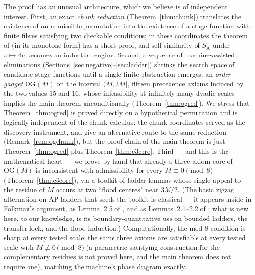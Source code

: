 \documentclass[11pt]{article}
\theoremstyle{definition}
\newcommand{\SA}{S_{\mathrm{A}}}
\newcommand{\OG}{\mathrm{OG}}
\begin{document}
The proof has an unusual architecture, which we believe is of independent
interest. First, an exact \emph{chunk reduction} (Theorem~\ref{thm:chunk})
translates the existence of an admissible permutation into the existence of
a stage function with finite fibres satisfying two checkable conditions; in
these coordinates the theorem of \cite{DEGS77} (in its monotone form) has a
short proof, and self-similarity of $\SA$ under $v \mapsto 4v$ becomes
an induction engine. Second, a sequence of machine-assisted eliminations
(Sections~\ref{sec:negative}--\ref{sec:ladder}) shrinks the search space of
candidate stage functions until a single finite obstruction emerges: an
\emph{order gadget} $\OG(M)$ on the interval $(M, 2M]$, fifteen precedence
axioms induced by the two values $15$ and $16$, whose infeasibility at
infinitely many dyadic scales implies the main theorem unconditionally
(Theorem~\ref{thm:ogred}). We stress that Theorem~\ref{thm:ogred} is
proved directly on a hypothetical permutation and is logically independent
of the chunk calculus: the chunk coordinates served as the discovery
instrument, and give an alternative route to the same reduction
(Remark~\ref{rem:ogchunk}), but the proof chain of the main theorem is
just Theorem~\ref{thm:ogred} plus Theorem~\ref{thm:c3core}. Third --- and this is the mathematical heart --- we
prove by hand that already a three-axiom core of $\OG(M)$ is inconsistent
with admissibility for every $M \equiv 0 \pmod 8$ (Theorem~\ref{thm:c3core}),
via a toolkit of ladder lemmas whose single appeal to the residue of $M$
occurs at two ``flood centres'' near $3M/2$. (The basic zigzag alternation
on AP-ladders that seeds the toolkit is classical --- it appears inside
\cite{DEGS77} in Folkman's argument, as Lemma~2.5 of \cite{HS24}, and as
Lemmas~2.1--2.2 of \cite{Gen26}; what is new here, to our knowledge, is its
boundary-quantitative
use on bounded ladders, the transfer lock, and the flood induction.) Computationally, the mod-$8$ condition is sharp at every tested scale:
the same three axioms are satisfiable at every tested scale with
$M \not\equiv 0 \pmod 8$ (a parametric satisfying construction for the
complementary residues is not proved here, and the main theorem does not
require one),
matching the machine's phase diagram exactly.
\end{document}
